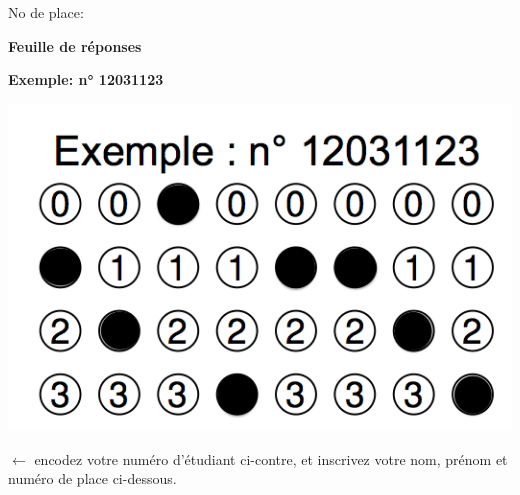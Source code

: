 \documentclass[a4paper]{article}
\begin{document}
{{{\begin{minipage}{.9\linewidth}
      No de place:

      \vspace*{.5cm}\dotfill

      \vspace*{1mm}
    \end{minipage}
  }
}\hspace*{\fill}
\vspace{1ex}





\AMCcleardoublepage

\AMCdebutFormulaire

{\large\bf\noindent Feuille de réponses}

{\setlength{\parindent}{0pt}\hspace*{\fill}

{\bf Exemple: n° 12031123}

\includegraphics[trim = 30px 0 0 77px, clip,scale=0.25]{src/graphics/expleNoEtudiant.png}\hspace*{\fill}

\hspace*{\fill}
\begin{minipage}[b]{6.5cm}\setlength{\parindent}{0pt}
$\longleftarrow{}$\hspace{0pt plus 1cm} encodez votre numéro d'étu\-diant ci-contre,
et inscrivez votre nom, prénom et numéro de place ci-dessous.

\vspace{3ex}

\hfill{}
\end{minipage}}}
\end{document}
